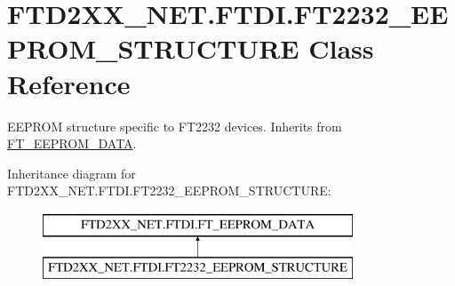 \hypertarget{class_f_t_d2_x_x___n_e_t_1_1_f_t_d_i_1_1_f_t2232___e_e_p_r_o_m___s_t_r_u_c_t_u_r_e}{}\section{F\+T\+D2\+X\+X\+\_\+\+N\+E\+T.\+F\+T\+D\+I.\+F\+T2232\+\_\+\+E\+E\+P\+R\+O\+M\+\_\+\+S\+T\+R\+U\+C\+T\+U\+RE Class Reference}
\label{class_f_t_d2_x_x___n_e_t_1_1_f_t_d_i_1_1_f_t2232___e_e_p_r_o_m___s_t_r_u_c_t_u_r_e}


E\+E\+P\+R\+OM structure specific to F\+T2232 devices. Inherits from \mbox{\hyperlink{class_f_t_d2_x_x___n_e_t_1_1_f_t_d_i_1_1_f_t___e_e_p_r_o_m___d_a_t_a}{F\+T\+\_\+\+E\+E\+P\+R\+O\+M\+\_\+\+D\+A\+TA}}.  


Inheritance diagram for F\+T\+D2\+X\+X\+\_\+\+N\+E\+T.\+F\+T\+D\+I.\+F\+T2232\+\_\+\+E\+E\+P\+R\+O\+M\+\_\+\+S\+T\+R\+U\+C\+T\+U\+RE\+:\begin{figure}[H]
\begin{center}
\leavevmode
\includegraphics[height=2.000000cm]{class_f_t_d2_x_x___n_e_t_1_1_f_t_d_i_1_1_f_t2232___e_e_p_r_o_m___s_t_r_u_c_t_u_r_e}
\end{center}
\end{figure}

